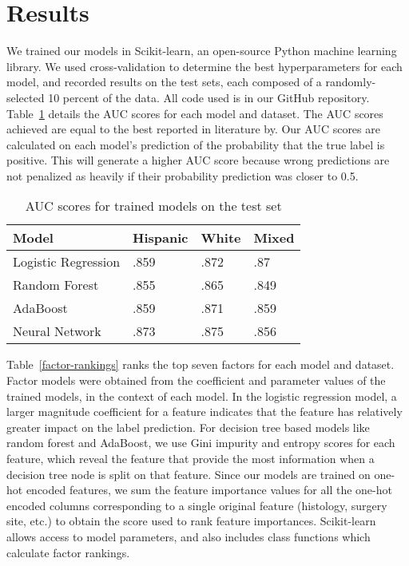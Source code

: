 \documentclass[review]{elsarticle}
\begin{document}
\section{Results}
We trained our models in Scikit-learn, an open-source Python machine learning library. We used cross-validation to determine the best hyperparameters for each model, and recorded results on the test sets, each composed of a randomly-selected 10 percent of the data. All code used is in our GitHub repository\cite{cancer_survivability}. Table~\ref{auc-scores} details the AUC scores for each model and dataset. The AUC scores achieved are equal to the best reported in literature by\cite{al2017survivability}. Our AUC scores are calculated on each model's prediction of the probability that the true label is positive. This will generate a higher AUC score because wrong predictions are not penalized as heavily if their probability prediction was closer to 0.5.
\begin{table}[H]
	\centering
	\begin{tabular}{llll}
		\textbf{Model}      & \textbf{Hispanic} & \textbf{White} & \textbf{Mixed}  \\ 
		\hline
		Logistic Regression & .859              & .872           & .87             \\
		Random Forest       & .855              & .865           & .849            \\
		AdaBoost            & .859              & .871           & .859            \\
		Neural Network       & .873              & .875           & .856           
	\end{tabular}
	\caption{AUC scores for trained models on the test set}
	\label{auc-scores}
\end{table}

Table~\ref{factor-rankings} ranks the top seven factors for each model and dataset. Factor models were obtained from the coefficient and parameter values of the trained models, in the context of each model. In the logistic regression model, a larger magnitude coefficient for a feature indicates that the feature has relatively greater impact on the label prediction. For decision tree based models like random forest and AdaBoost, we use Gini impurity and entropy scores for each feature, which reveal the feature that provide the most information when a decision tree node is split on that feature. Since our models are trained on one-hot encoded features, we sum the feature importance values for all the one-hot encoded columns corresponding to a single original feature (histology, surgery site, etc.) to obtain the score used to rank feature importances. Scikit-learn allows access to model parameters, and also includes class functions which calculate factor rankings.
\end{document}
